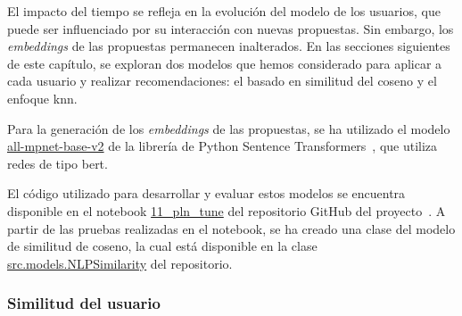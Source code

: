 El impacto del tiempo se refleja en la evolución del modelo de los usuarios, que puede ser influenciado por su interacción con nuevas propuestas. Sin embargo, los \textit{embeddings} de las propuestas permanecen inalterados. En las secciones siguientes de este capítulo, se exploran dos modelos que hemos considerado para aplicar a cada usuario y realizar recomendaciones: el basado en similitud del coseno y el enfoque \gls{knn}.

Para la generación de los \textit{embeddings} de las propuestas, se ha utilizado el modelo \url{all-mpnet-base-v2} de la librería de Python Sentence Transformers~\cite{reimers_sentence-bert_2019}, que utiliza redes de tipo \gls{bert}.

El código utilizado para desarrollar y evaluar estos modelos se encuentra disponible en el notebook \url{11_pln_tune} del repositorio GitHub del proyecto~\cite{davo_daviddavoupm-tfm-notebooks_2024}. A partir de las pruebas realizadas en el notebook, se ha creado una clase del modelo de similitud de coseno, la cual está disponible en la clase \url{src.models.NLPSimilarity} del repositorio.

\subsubsection{Similitud del usuario}


